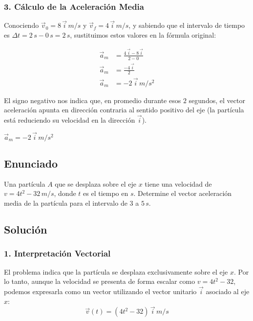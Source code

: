 \documentclass[12pt, a4paper]{article}
\begin{document}
\subsubsection*{3. Cálculo de la Aceleración Media}
Conociendo $\vec{v}_0 = 8 \, \vec{i} \, \si{m/s}$ y $\vec{v}_f = 4 \, \vec{i} \, \si{m/s}$, y sabiendo que el intervalo de tiempo es $\Delta t = 2 \, \si{s} - 0 \, \si{s} = 2 \, \si{s}$, sustituimos estos valores en la fórmula original:

\begin{align*}
    \vec{a}_m &= \frac{4 \, \vec{i} - 8 \, \vec{i}}{2 - 0} \\
    \vec{a}_m &= \frac{-4 \, \vec{i}}{2} \\
    \vec{a}_m &= -2 \, \vec{i} \, \si{m/s^2}
\end{align*}

El signo negativo nos indica que, en promedio durante esos $2$ segundos, el vector aceleración apunta en dirección contraria al sentido positivo del eje (la partícula está reduciendo su velocidad en la dirección $\vec{i}$).

\begin{tcolorbox}[colback=green!5!white, colframe=green!50!black, title=Respuesta Final]
\centering \Large $\vec{a}_m = -2 \, \vec{i} \, \si{m/s^2}$
\end{tcolorbox}

\newpage

\subsection*{Enunciado}
Una partícula $A$ que se desplaza sobre el eje $x$ tiene una velocidad de $v = 4t^2 - 32 \, \si{m/s}$, donde $t$ es el tiempo en $\si{s}$. Determine el vector aceleración media de la partícula para el intervalo de $3$ a $5 \, \si{s}$.

\subsection*{Solución}

\subsubsection*{1. Interpretación Vectorial}
El problema indica que la partícula se desplaza exclusivamente sobre el eje $x$. Por lo tanto, aunque la velocidad se presenta de forma escalar como $v = 4t^2 - 32$, podemos expresarla como un vector utilizando el vector unitario $\vec{i}$ asociado al eje $x$:
$$ \vec{v}(t) = (4t^2 - 32) \, \vec{i} \, \si{m/s} $$
\end{document}
